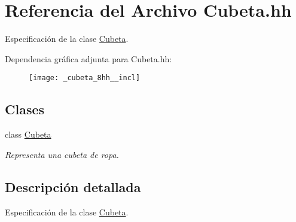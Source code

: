 \hypertarget{_cubeta_8hh}{}\section{Referencia del Archivo Cubeta.\+hh}
\label{_cubeta_8hh}


Especificación de la clase \hyperlink{class_cubeta}{Cubeta}.  


Dependencia gráfica adjunta para Cubeta.\+hh\+:\nopagebreak
\begin{figure}[H]
\begin{center}
\leavevmode
\texttt{[image: \_cubeta\_8hh\_\_incl]}
\end{center}
\end{figure}
\subsection*{Clases}
\begin{DoxyCompactItemize}
\item 
class \hyperlink{class_cubeta}{Cubeta}
\begin{DoxyCompactList}\small\item\em Representa una cubeta de ropa. \end{DoxyCompactList}\end{DoxyCompactItemize}


\subsection{Descripción detallada}
Especificación de la clase \hyperlink{class_cubeta}{Cubeta}. 

